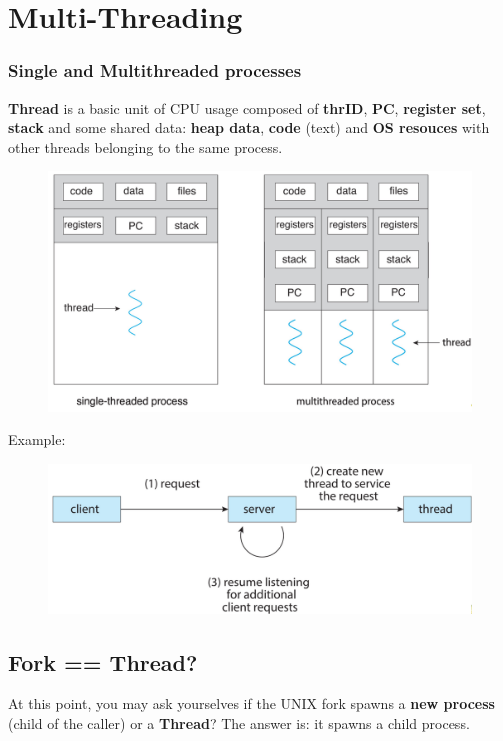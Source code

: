 \newpage

\section{Multi-Threading}

\subsubsection{Single and Multithreaded processes}

\textbf{Thread} is a basic unit of CPU usage composed of \textbf{thrID}, \textbf{PC}, \textbf{register set}, \textbf{stack} and some shared data: \textbf{heap data}, \textbf{code} (text) and \textbf{OS resouces} with other threads belonging to the same process.

\begin{figure}[htbp]
    \centering
    \includegraphics[width=0.65\linewidth]{img/threads.png}   
\end{figure}

Example:
\begin{figure}[htbp]
    \centering
    \includegraphics[width=0.65\linewidth]{img/thread_EX.png}   
    
\end{figure}



\subsection{Fork == Thread?}
At this point, you may ask yourselves if the UNIX fork spawns a \textbf{new process} (child of the caller) or a \textbf{Thread}? The answer is: it spawns a child process.

